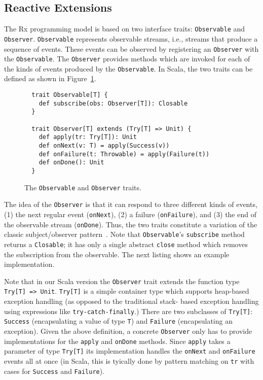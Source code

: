 \documentclass{acm_proc_article-sp}
\begin{document}
\subsection{Reactive Extensions}

The Rx programming model is based on two interface traits: \verb|Observable|
and \verb|Observer|. \verb|Observable| represents observable streams, i.e.,
streams that produce a sequence of events. These events can be observed by
registering an \verb|Observer| with the \verb|Observable|. The \verb|Observer|
provides methods which are invoked for each of the kinds of events produced by
the \verb|Observable|. In Scala, the two traits can be defined as shown in
Figure~\ref{fig:observable-observer}.

\begin{figure}[ht!]
  \centering
  \lstset{numbers=none,xleftmargin=0em}
  \begin{lstlisting}
  trait Observable[T] {
    def subscribe(obs: Observer[T]): Closable
  }

  trait Observer[T] extends (Try[T] => Unit) {
    def apply(tr: Try[T]): Unit
    def onNext(v: T) = apply(Success(v))
    def onFailure(t: Throwable) = apply(Failure(t))
    def onDone(): Unit
  }
  \end{lstlisting}
  \caption{The \texttt{Observable} and \texttt{Observer} traits.}
  \label{fig:observable-observer}
\end{figure}

The idea of the \verb|Observer| is that it can respond to three different
kinds of events, (1) the next regular event (\verb|onNext|), (2) a failure
(\verb|onFailure|), and (3) the end of the observable stream (\verb|onDone|).
Thus, the two traits constitute a variation of the classic subject/observer
pattern~\cite{EugsterFGK03}. Note that \verb|Observable|'s \verb|subscribe|
method returns a \verb|Closable|; it has only a single abstract \verb|close|
method which removes the subscription from the observable. The next listing
shows an example implementation.

Note that in our Scala version the \verb|Observer| trait extends the function
type \verb|Try[T] => Unit|. \verb|Try[T]| is a simple container type which
supports heap-based exception handling (as opposed to the traditional stack-
based exception handling using expressions like \verb|try-catch-finally|.)
There are two subclasses of \verb|Try[T]|: \verb|Success| (encapsulating a
value of type \verb|T|) and \verb|Failure| (encapsulating an exception). Given
the above definition, a concrete \verb|Observer| only has to provide
implementations for the \verb|apply| and \verb|onDone| methods. Since
\verb|apply| takes a parameter of type \verb|Try[T]| its implementation
handles the \verb|onNext| and \verb|onFailure| events all at once (in Scala,
this is tyically done by pattern matching on \verb|tr| with cases for
\verb|Success| and \verb|Failure|).
\end{document}
